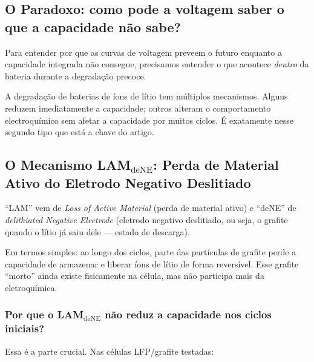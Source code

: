 \documentclass[12pt,a4paper]{article}
\begin{document}
\subsection{O Paradoxo: como pode a voltagem saber o que a capacidade n\~ao sabe?}

Para entender por que as curvas de voltagem preveem o futuro enquanto a
capacidade integrada n\~ao consegue, precisamos entender o que acontece
\textit{dentro} da bateria durante a degrada\c{c}\~ao precoce.

A degrada\c{c}\~ao de baterias de \'{i}ons de l\'{i}tio tem m\'{u}ltiplos mecanismos.
Alguns reduzem imediatamente a capacidade; outros alteram o comportamento
electroqu\'{i}mico sem afetar a capacidade por muitos ciclos. \'{E} exatamente
nesse segundo tipo que est\'{a} a chave do artigo.

\subsection{O Mecanismo LAM$_\text{deNE}$: Perda de Material Ativo do Eletrodo
Negativo Deslitiado}

\begin{conceito}
``LAM'' vem de \textit{Loss of Active Material} (perda de material ativo) e
``deNE'' de \textit{delithiated Negative Electrode} (eletrodo negativo deslitiado,
ou seja, o grafite quando o l\'{i}tio j\'{a} saiu dele --- estado de descarga).

Em termos simples: ao longo dos ciclos, parte das part\'{i}culas de grafite
perde a capacidade de armazenar e liberar \'{i}ons de l\'{i}tio de forma revers\'{i}vel.
Esse grafite ``morto'' ainda existe fisicamente na c\'{e}lula, mas n\~ao participa
mais da eletroqu\'{i}mica.
\end{conceito}

\subsubsection{Por que o LAM$_\text{deNE}$ n\~ao reduz a capacidade nos ciclos iniciais?}

Essa \'{e} a parte crucial. Nas c\'{e}lulas LFP/grafite testadas:
\end{document}
